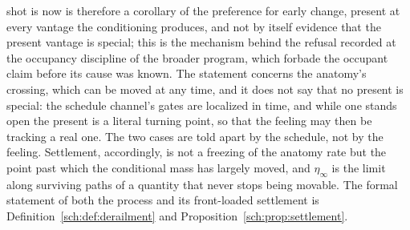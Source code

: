 shot is now is therefore a corollary of the preference for early
change, present at every vantage the conditioning produces, and not
by itself evidence that the present vantage is special; this is the mechanism
behind the refusal recorded at the occupancy discipline of the broader program,
which forbade the occupant claim before its cause was known. The statement concerns the anatomy's crossing, which can be moved at any time, and it does not say that no present is special: the schedule channel's gates are localized in time, and while one stands open the present is a literal turning point, so that the feeling may then be tracking a real one. The two cases are told apart by the schedule, not by the feeling.
Settlement, accordingly, is not a freezing of the anatomy rate but the point
past which the conditional mass has largely moved, and $\eta_\infty$
is the limit along surviving paths of a quantity that never stops
being movable. The formal statement of both the process and its
front-loaded settlement is Definition~\ref{sch:def:derailment} and
Proposition~\ref{sch:prop:settlement}.

